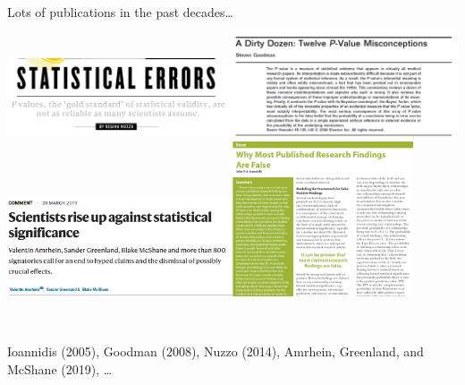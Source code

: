 \documentclass[
  10pt,
  ignorenonframetext,
]{beamer}
\begin{document}
\begin{frame}
\begin{block}{Lots of publications in the past decades\ldots{}}
\protect\hypertarget{lots-of-publications-in-the-past-decades}{}
\(~\)

\includegraphics[width=0.5\textwidth,height=\textheight]{graphics/nuzzo.png}\includegraphics[width=0.5\textwidth,height=\textheight]{graphics/dirtydozen.png}
\includegraphics[width=0.5\textwidth,height=\textheight]{graphics/against_ss.png}\includegraphics[width=0.4\textwidth,height=\textheight]{graphics/Ioannidis2.png}

\(~\)

\scriptsize

Ioannidis (2005), Goodman (2008), Nuzzo (2014), Amrhein, Greenland, and
McShane (2019), \ldots{}
\end{block}
\end{frame}
\end{document}

